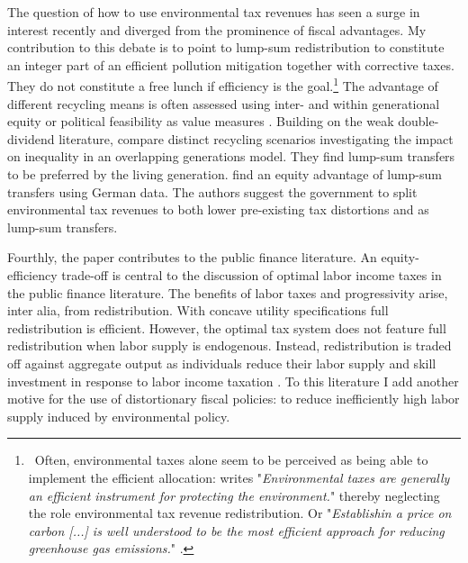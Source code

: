 The question of how to use environmental tax revenues has seen a surge in interest recently and diverged from the prominence of fiscal advantages. 
My contribution to this debate is to point to lump-sum redistribution to constitute an integer part of an efficient pollution mitigation together with corrective taxes.
 They do not constitute a free lunch if efficiency is the goal.\footnote{\ Often, environmental taxes alone seem to be perceived as being able to implement the efficient allocation: \cite{LansBovenberg1999GreenGuide} writes "\textit{Environmental taxes are  generally  an  efficient  instrument  for  protecting  the  environment.}" thereby neglecting the role environmental tax revenue redistribution. Or "\textit{Establishin a price on carbon [...] is well understood to be the most efficient approach for reducing greenhouse gas emissions.}" \citep{Fried2018TheGenerations}. } 
The advantage of different recycling means is often assessed using inter- and within generational equity or political feasibility as value measures \citep{Carattini2018, Goulder2019IncomeGroups, VANDERPLOEG2022103966, Kotlikoff2021MakingWin, Carbone2013DeficitImpacts}. Building on the weak double-dividend literature, \cite{Fried2018TheGenerations} compare distinct recycling scenarios investigating the impact on inequality in an overlapping generations model. They find lump-sum transfers to be preferred by the  living generation.  \cite{VANDERPLOEG2022103966} find an equity advantage of lump-sum transfers using German data. The authors suggest the government to split environmental tax revenues to both lower pre-existing tax distortions and as lump-sum transfers. %


Fourthly, the paper contributes to the public finance literature.
An equity-efficiency trade-off is central to the discussion of optimal labor income taxes in the public finance literature.  The benefits of labor taxes and progressivity arise, inter alia, from redistribution. %
With concave utility specifications full redistribution is efficient. However, the optimal tax system does not feature full redistribution when labor supply is endogenous. Instead, redistribution is traded off against aggregate output as individuals reduce their labor supply and skill investment in response to labor income taxation \citep{Heathcote2017OptimalFramework, Conesa2009TaxingAll, Domeij2004OnTaxes}.
To this literature I add another motive for the use of distortionary fiscal policies: to reduce inefficiently high labor supply induced by environmental policy. 


